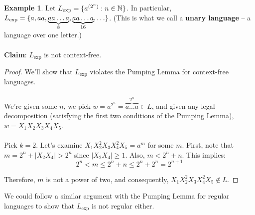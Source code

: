 \documentclass[]{article}
\DeclarePairedDelimiter{\set}{\lbrace}{\rbrace}
\theoremstyle{definition}
\newtheorem{ex}{Example}[section]
\newcommand{\lecture}[1]{\marginpar{{\footnotesize $\leftarrow$ \underline{#1}}}}
\begin{document}
      \begin{ex} \lecture{October 29, 2013}
        Let $L_\text{exp} = \set{a^{(2^n)} : n \in \mathbb{N} }$. In particular, $L_\text{exp} = \set{ a, aa, \underbrace{aa \ldots a}_8, \underbrace{aa \ldots a}_{16}, \ldots }$. (This is what we call a \textbf{unary language} -- a language over one letter.)
        \\ \\
        \textbf{Claim}: $L_\text{exp}$ is not context-free.

        \begin{proof}
          We'll show that $L_\text{exp}$ violates the Pumping Lemma for context-free languages.
          \\ \\
          We're given some $n$, we pick $w = a^{2^n} = \overbrace{a \ldots a}^{2^n} \in L$, and given any legal decomposition (satisfying the first two conditions of the Pumping Lemma), $w = X_1 X_2 X_3 X_4 X_5$.
          \\ \\
          Pick $k = 2$. Let's examine $X_1 X_2^2 X_3 X_4^2 X_5 = a^m$ for some $m$. First, note that $m = 2^n + |X_2 X_4| > 2^n$ since $|X_2 X_4| \ge 1$. Also, $m < 2^n + n$. This implies:
          $$
            2^n < m \le 2^n + n \le 2^n + 2^n = 2^{n + 1}
          $$

          Therefore, $m$ is not a power of two, and consequently, $X_1 X_2^2 X_3 X_4^2 X_5 \not \in L$.
        \end{proof}

        We could follow a similar argument with the Pumping Lemma for regular languages to show that $L_\text{exp}$ is not regular either.
      \end{ex}
\end{document}
